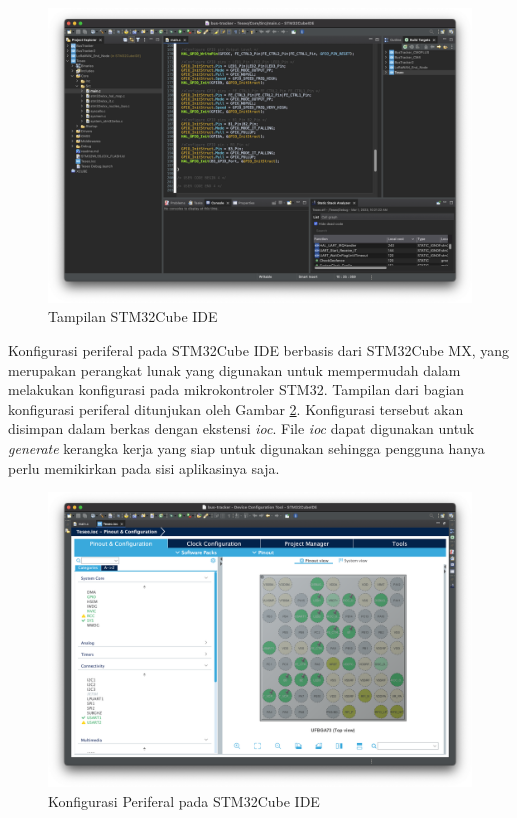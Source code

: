 \begin{figure}[H]
	\centering
	\includegraphics[width=12cm]{contents/chapter-2/stm32-ide.png}
	\caption{Tampilan STM32Cube IDE}
	\label{Fig: stm32-ide}
\end{figure}

Konfigurasi periferal pada STM32Cube IDE berbasis dari STM32Cube MX, yang merupakan perangkat lunak yang digunakan untuk mempermudah dalam melakukan konfigurasi pada mikrokontroler STM32. Tampilan dari bagian konfigurasi periferal ditunjukan oleh Gambar \ref{Fig: stm32-mx}. Konfigurasi tersebut akan disimpan dalam berkas dengan ekstensi \textit{ioc}. File \textit{ioc} dapat digunakan untuk \textit{generate} kerangka kerja yang siap untuk digunakan sehingga pengguna hanya perlu memikirkan pada sisi aplikasinya saja.

\begin{figure}[H]
	\centering
	\includegraphics[width=12cm]{contents/chapter-2/stm32-mx.png}
	\caption{Konfigurasi Periferal pada STM32Cube IDE}
	\label{Fig: stm32-mx}
\end{figure}

